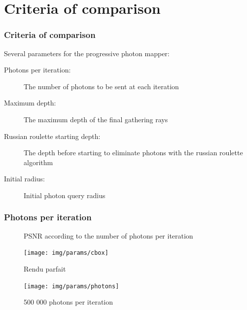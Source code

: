 \documentclass{beamer}
\begin{document}
\section{Criteria of comparison}
\begin{frame}
    \frametitle{Criteria of comparison}
    Several parameters for the progressive photon mapper:
    \begin{description}
        \item[Photons per iteration:] The number of photons to be sent at each iteration
        \item[Maximum depth:] The maximum depth of the final gathering rays
        \item[Russian roulette starting depth:] The depth before starting to eliminate photons with the russian roulette algorithm
        \item[Initial radius:] Initial photon query radius
    \end{description}
\end{frame}
\begin{frame}
    \frametitle{Photons per iteration}
    \begin{minipage}{0.5\textwidth}
    \end{minipage}
    \begin{minipage}{\textwidth}
        \begin{figure}
            \centering
            \caption{PSNR according to the number of photons per iteration}
        \end{figure}
    \end{minipage}
\end{frame}
\begin{frame}
    \begin{figure}
        \texttt{[image: img/params/cbox]}
        \caption{Rendu parfait}
    \end{figure}
\end{frame}
\begin{frame}
    \begin{figure}
        \texttt{[image: img/params/photons]}
        \caption{500 000 photons per iteration}
    \end{figure}
\end{frame}
\end{document}
